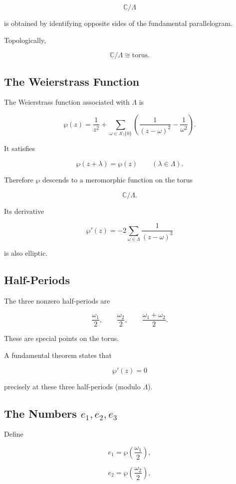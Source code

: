 \documentclass[12pt,a4paper]{article}
\theoremstyle{notespace}
\begin{document}
\[
\mathbb C/\Lambda
\]

is obtained by identifying opposite sides of the fundamental parallelogram.

Topologically,

\[
\boxed{\mathbb C/\Lambda \cong \text{torus}.}
\]

\subsection{The Weierstrass Function}

The Weierstrass function associated with \(\Lambda\) is

\[
\wp(z)
=
\frac{1}{z^2}
+
\sum_{\omega\in\Lambda\setminus\{0\}}
\left(
\frac{1}{(z-\omega)^2}
-
\frac{1}{\omega^2}
\right).
\]

It satisfies

\[
\wp(z+\lambda)=\wp(z)
\qquad
(\lambda\in\Lambda).
\]

Therefore \(\wp\) descends to a meromorphic function on the torus

\[
\mathbb C/\Lambda.
\]

Its derivative

\[
\wp'(z)
=
-2
\sum_{\omega\in\Lambda}
\frac{1}{(z-\omega)^3}
\]

is also elliptic.

\subsection{Half-Periods}

The three nonzero half-periods are

\[
\frac{\omega_1}{2},
\qquad
\frac{\omega_2}{2},
\qquad
\frac{\omega_1+\omega_2}{2}.
\]

These are special points on the torus.

A fundamental theorem states that

\[
\wp'(z)=0
\]

precisely at these three half-periods (modulo \(\Lambda\)).

\subsection{The Numbers \(e_1,e_2,e_3\)}

Define

\[
e_1
=
\wp\!\left(\frac{\omega_1}{2}\right),
\]

\[
e_2
=
\wp\!\left(\frac{\omega_2}{2}\right),
\]
\end{document}
